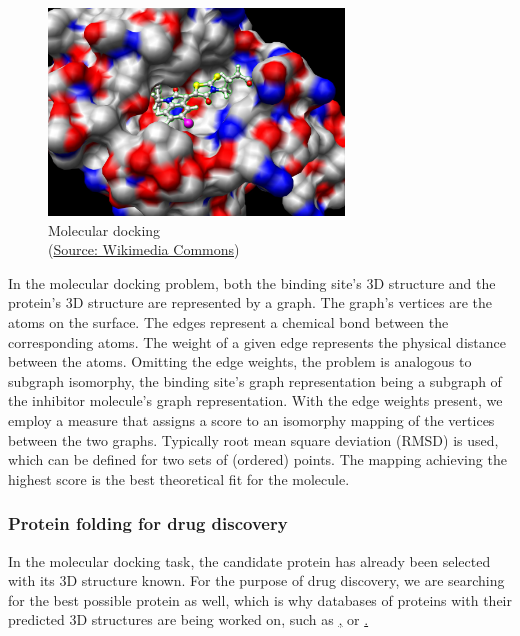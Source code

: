 \begin{figure}[H]
    \centering
    \includegraphics[width=0.7\textwidth]{figures/bioinformatics/molecular_docking.jpg}
    \caption{Molecular docking \\(\href{https://commons.wikimedia.org/wiki/File:Docking.jpg}{Source: Wikimedia Commons})}
\end{figure}

In the molecular docking problem, both the binding site's 3D structure and the protein's 3D structure are represented by a graph. The graph's vertices are the atoms on the surface. The edges represent a chemical bond between the corresponding atoms. The weight of a given edge represents the physical distance between the atoms. Omitting the edge weights, the problem is analogous to subgraph isomorphy, the binding site's graph representation being a subgraph of the inhibitor molecule's graph representation. With the edge weights present, we employ a measure that assigns a score to an isomorphy mapping of the vertices between the two graphs. Typically root mean square deviation (RMSD) is used, which can be defined for two sets of (ordered) points. The mapping achieving the highest score is the best theoretical fit for the molecule.
 \cite{wang_protein_2021}
 
\subsubsection{Protein folding for drug discovery}

In the molecular docking task, the candidate protein has already been selected with its 3D structure known. For the purpose of drug discovery, we are searching for the best possible protein as well, which is why databases of proteins with their predicted 3D structures are being worked on, such as \href{https://www.uniprot.org/}, or \href{https://alphafold.ebi.ac.uk/}. \cite{senior_improved_2020}

